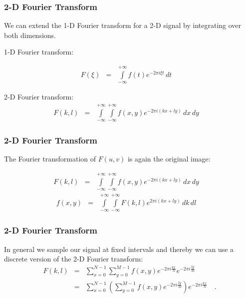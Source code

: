 \begin{frame}
\frametitle{2-D Fourier Transform}
We can extend the 1-D Fourier transform for a 2-D signal by integrating over both dimensions.\newline

1-D Fourier transform:

\begin{eqnarray*}
 F(\xi)&=& \int\limits_{-\infty}^{+\infty} f(t) e^{-2\pi i\xi t} \, dt\quad
\end{eqnarray*}

2-D Fourier transform:
\begin{eqnarray*}
 F(k,l)&=& \int\limits_{-\infty}^{+\infty}\int\limits_{-\infty}^{+\infty} f(x,y) e^{-2\pi i(kx + ly)} \, dx\, dy\quad
\end{eqnarray*}
\end{frame}
%
%
%
\begin{frame}
\frametitle{2-D Fourier Transform}
The Fourier transformation of $F(u,v)$ is again the original image:\newline

\begin{eqnarray*}
 F(k,l)&=& \int\limits_{-\infty}^{+\infty}\int\limits_{-\infty}^{+\infty} f(x,y) e^{-2\pi i(kx + ly)} \, dx\, dy\quad
\end{eqnarray*}
%
\begin{eqnarray*}
 f(x,y)&=& \int\limits_{-\infty}^{+\infty}\int\limits_{-\infty}^{+\infty} F(k,l) e^{2\pi i(kx + ly)} \, dk\, dl\quad
\end{eqnarray*}
\end{frame}
%
%
%
\begin{frame}
\frametitle{2-D Fourier Transform}
In general we sample our signal at fixed intervals and thereby we can use a discrete version of the 2-D Fourier transform:\newline
%
%
\begin{eqnarray*}
  F(k,l)& =& \sum^{N-1}_{x=0}
        \sum^{M-1}_{y=0} f(x,y)
          e^{-2\pi i\frac{kx}{N}} 
          e^{-2\pi i\frac{ly}{M}}\\
         &=&\sum^{N-1}_{x=0} 
        \left( 
         \sum^{M-1}_{y=0} f(x,y) e^{-2\pi i\frac{ly}{M}}
        \right)
        e^{-2\pi i\frac{kx}{N}}\quad .
\end{eqnarray*}
\end{frame}


